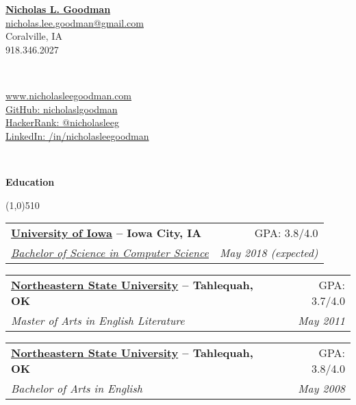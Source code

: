 \documentclass[letterpaper,11pt]{article}
\makeatletter
\newcommand{\resheading}[1]{{\large {\begin{minipage}{\textwidth}{\textbf{#1 \vphantom{p\^{E}}}}\end{minipage}}}}
\newcommand{\ressubheading}[4]{
\begin{tabular*}{6.5in}{l@{\extracolsep{\fill}}r}
		\textbf{#1} & #2 \\
		\textit{#3} & \textit{#4} \\
\end{tabular*}\vspace{-6pt}}
\makeatother
\begin{document}
\newcommand{\mywebheader}{

    \begin{center}
	\textbf{\href{http://www.nicholasleegoodman.com/}{\LARGE Nicholas L. Goodman}}\\
		\href{mailto:nicholas.lee.goodman@gmail.com}{nicholas.lee.goodman@gmail.com}\\
		{Coralville, IA} \\
	{918.346.2027}
	\end{center}
	\\
	\begin{multicols}{2}


	\href{http://www.nicholasleegoodman.com}{www.nicholasleegoodman.com} \\ 
	\href{https://github.com/nicholaslgoodman}{GitHub: nicholaslgoodman} \\
	\href{https://www.hackerrank.com/nicholasleeg}{HackerRank: @nicholasleeg} \\ 
	\href{https://www.linkedin.com/in/nicholasleegoodman}{LinkedIn: /in/nicholasleegoodman} \\
	

		\end{multicols}

\\
\renewcommand{\labelitemi}{$-$}

\vspace{0.1in}}

\mywebheader



\resheading {Education}

\line(1,0){510}

	\begin{description}

		\item
			\ressubheading {
			\href{http://www.truman.edu}{University of Iowa}{ -- Iowa City, IA}}{GPA: 3.8/4.0}
			{\href{http://www.truman.edu/majors-programs/majors-minors/computer-science-major/}{Bachelor of Science in Computer Science}}
			{ \footnotesize{May 2018 (expected)}}
			
		\item
			\ressubheading {
			\href{http://www.nsuok.edu}{Northeastern State University}{ -- Tahlequah, OK}}{GPA: 3.7/4.0}
			{Master of Arts in English Literature}
			{ \footnotesize{May 2011}}
			
		\item
			\ressubheading {
			\href{http://www.nsuok.edu}{Northeastern State University}{ -- Tahlequah, OK}}{GPA: 3.8/4.0}
			{Bachelor of Arts in English}
			{ \footnotesize{May 2008}}

		\end{description} %
\end{document}
